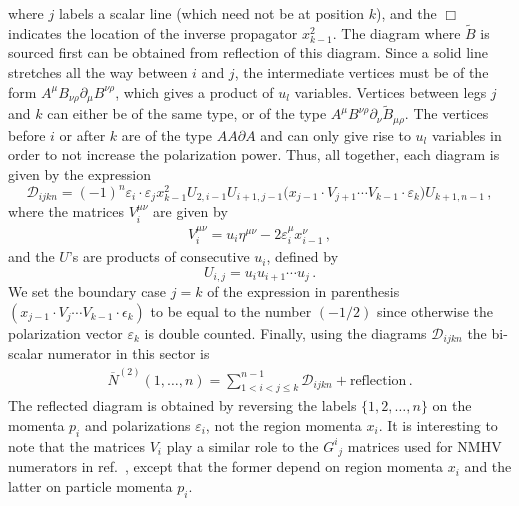 \documentclass[11pt,a4paper]{article}
\newcommand{\ee}[2]{\varepsilon_{#1} {\cdot} \varepsilon_{#2}}
\newcommand{\z}{x}
\begin{document}
where $j$ labels a scalar line (which need not be at position $k$), and the $\Box$ indicates the location of the inverse propagator $\z_{k-1}^2$.
The diagram where $\tilde{B}$ is sourced first can be obtained from reflection of this diagram. 
Since a solid line stretches all the way between $i$ and $j$, the intermediate vertices must be of the form $A^\mu B_{\nu\rho}\partial_\mu B^{\nu\rho}$, which gives a product of $u_l$ variables. Vertices between legs $j$ and $k$ can either be of the same type, or of the type $A^\mu B^{\nu\rho}\partial_\nu\tilde{B}_{\mu\rho}$.
The vertices before $i$ or after $k$ are of the type $AA\partial A$ and can only give rise to $u_l$ variables in order to not increase the polarization power. Thus, all together, each diagram is given by the expression
\begin{equation}
\mathcal{D}_{ijkn} = (-1)^n \ee{i}{j} \z_{k-1}^2 U_{2,i-1}U_{i+1,j-1} \big(\z_{j-1}\cdot V_{j+1}\cdots V_{k-1}\cdot \varepsilon_k\big) U_{k+1,n-1} \, ,
\end{equation}
where the matrices $V_i^{\mu\nu} $ are given by
\begin{eqnarray}
V_i^{\mu\nu} = u_i \eta^{\mu\nu}  - 2\varepsilon_{i}^\mu \z_{i-1}^\nu \, ,
\end{eqnarray}
and the $U$'s are products of consecutive $u_i$, defined by
\begin{equation} \label{Udef}
    U_{i,j} = u_i u_{i+1}\cdots u_{j} \, .
\end{equation}
We set the boundary case $j=k$ of the expression in parenthesis $(\z_{j-1}\cdot V_j\cdots V_{k-1}\cdot \epsilon_k)$ to be equal to the number $(-1/2)$ since otherwise the polarization vector $\varepsilon_{k}$ is double counted. Finally, using the diagrams $\mathcal{D}_{ijkn}$ the bi-scalar numerator in this  sector is
\begin{eqnarray} \label{N2biScalarnumerator}
\overline{N}^{(2)}(1,\ldots,n) = \sum_{1<i<j\leq k}^{n-1} \mathcal{D}_{ijkn} + \textrm{reflection} \, .
\end{eqnarray}
The reflected diagram is obtained by reversing the labels $\{1,2,\dots,n\}$ on the momenta $p_i$ and polarizations $\varepsilon_i$, not the region momenta $x_i$.
It is interesting to note that the matrices $V_i$ play a similar role to the $G^i{}_j$ matrices used for NMHV numerators in ref.~\cite{Chen:2021chy}, except that the former depend on region momenta $x_i$ and the latter on particle momenta $p_i$. 
\end{document}
